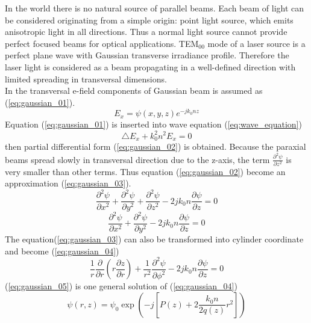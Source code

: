 In the world there is no natural source of parallel beams. Each beam of light can be considered originating from a simple origin: point light source, which emits anisotropic light in all directions. Thus a normal light source cannot provide perfect focused beams for optical applications. TEM$_{00}$ mode of a laser source is a perfect plane wave with Gaussian transverse irradiance profile\cite{CVI_Melles_Griot_Technical_Guide}. Therefore the laser light is considered as a beam propagating in a well-defined direction with limited spreading in transversal dimensions.\\ 
In \cite{ script_FT_TET} the transversal e-field components of Gaussian beam is assumed as (\ref{eq:gaussian_01}).
\begin{equation}
E_{x}=\psi(x,y,z)e^{-jk_{0}nz}
\label{eq:gaussian_01}
\end{equation}
Equation (\ref{eq:gaussian_01}) is inserted into wave equation (\ref{eq:wave_equation})
\begin{equation}
\bigtriangleup E_{x}+k^{2}_{0}n^{2}E_{x}=0
\label{eq:wave_equation}
\end{equation}
 then partial differential form (\ref{eq:gaussian_02}) is obtained. Because the paraxial beams spread slowly in transversal direction due to the z-axis, the term $\frac{\partial ^{2}\psi}{\partial z^2}$ is very smaller than other terms. Thus equation (\ref{eq:gaussian_02}) become an approximation (\ref{eq:gaussian_03}).
\begin{equation}
\frac{\partial ^{2}\psi}{\partial x^2}+\frac{\partial ^{2}\psi}{\partial y^2}+\frac{ \partial ^{2}\psi}{\partial z^2}-2jk_{0}n\frac{\partial\psi}{\partial z}=0
\label{eq:gaussian_02}
\end{equation}
\begin{equation}
\frac{ \partial ^{2}\psi}{\partial x^2}+\frac{\partial ^{2}\psi}{\partial y^2}-2jk_{0}n\frac{\partial\psi}{\partial z}=0
\label{eq:gaussian_03}
\end{equation}
The equation(\ref{eq:gaussian_03}) can also be transformed into cylinder coordinate and become (\ref{eq:gaussian_04})
\begin{equation}
\frac{1}{r}\frac{\partial}{\partial r}\left(r\frac{\partial z}{\partial r}\right)+\frac{1}{r^2}\frac{ \partial ^{2}\psi}{\partial \phi^2}-2jk_{0}n\frac{\partial\psi}{\partial z}=0
\label{eq:gaussian_04}
\end{equation}
(\ref{eq:gaussian_05}) is one general solution of (\ref{eq:gaussian_04})
\begin{equation}
\psi(r,z)=\psi_{0}\exp\left(-j\left[P(z)+2 \frac{ k_{0}n}{2q(z)}r^2\right]\right)
\label{eq:gaussian_05}
\end{equation}
